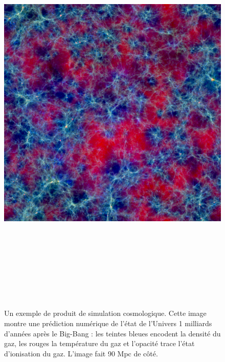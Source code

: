 \begin{figure}[htbp]
	\centering
		\includegraphics[height=20cm]{figs/simuemma.jpg}
	\caption[Un exemple de produit de simulation cosmologique]{Un exemple de produit de simulation cosmologique. Cette image montre une prédiction numérique de l'état de l'Univers 1 milliards d'années après le Big-Bang : les teintes bleues encodent la densité du gaz, les rouges la température du gaz et l'opacité trace l'état d'ionisation du gaz. L'image fait 90 Mpc de côté.}
	\label{f:simuemma}
\end{figure}

